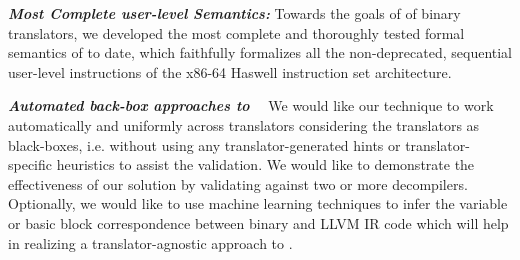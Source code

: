 \textbf{\emph{Most Complete user-level \ISA Semantics:}} Towards the goals of \tv of binary translators, we developed\cite{DasguptaAdve:PLDI19} the most complete and thoroughly tested formal
semantics of \ISA to date, which faithfully formalizes all the non-deprecated, sequential user-level instructions of the x86-64 Haswell instruction set architecture. 

\textbf{\emph{Automated back-box approaches to \tv~}} 
We would like our technique to
work automatically and uniformly across translators considering the translators as black-boxes,
     i.e. without using any translator-generated hints  or translator-specific
     heuristics to assist the validation. We would like to demonstrate the effectiveness  of our solution by validating against two or more decompilers.  Optionally, we would like to use machine learning techniques to infer the  variable or basic block correspondence between binary and LLVM IR code which will help in realizing a translator-agnostic approach to \tv. 
     

